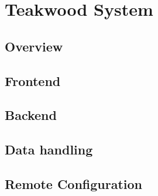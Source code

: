 \chapter{Teakwood System }

\section{Overview}
\section{Frontend}
\section{Backend}
\section{Data handling}
\section{Remote Configuration}

%
%


